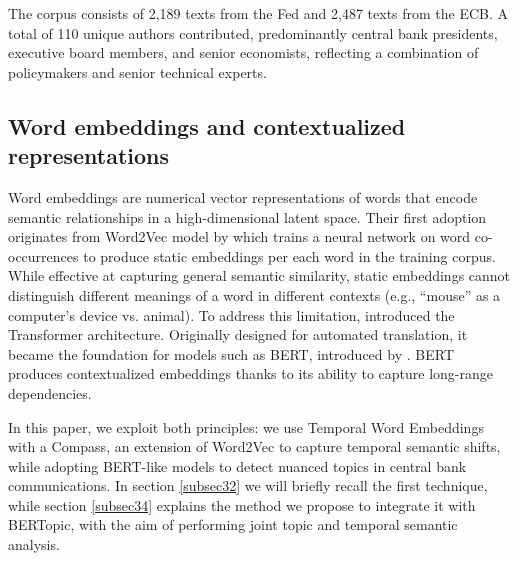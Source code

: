 The corpus consists of 2,189 texts from the Fed and 2,487 texts from the ECB. A total of 110 unique authors contributed, predominantly central bank presidents, executive board members, and senior economists, reflecting a combination of policymakers and senior technical experts.

\subsection{Word embeddings and contextualized representations}\label{subsec35}

Word embeddings are numerical vector representations of words that encode semantic relationships in a high-dimensional latent space. Their first adoption originates from Word2Vec model by \cite{Mikolov2013} which trains a neural network on word co-occurrences to produce static embeddings per each word in the training corpus. While effective at capturing general semantic similarity, static embeddings cannot distinguish different meanings of a word in different contexts (e.g., ``mouse'' as a computer's device vs. animal). To address this limitation, \cite{vaswani2017attention} introduced the Transformer architecture. Originally designed for automated translation, it became the foundation for models such as BERT, introduced by \cite{devlin-etal-2019-bert}. BERT produces contextualized embeddings thanks to its ability to
capture long-range dependencies.

In this paper, we exploit both principles: we use Temporal Word Embeddings with a Compass, an extension of Word2Vec to capture temporal semantic shifts, while adopting BERT-like models to detect nuanced topics in central bank communications. In section \ref{subsec32} we will briefly recall the first technique, while section \ref{subsec34} explains the method we propose to integrate it with BERTopic, with the aim of performing joint topic and temporal semantic analysis.


